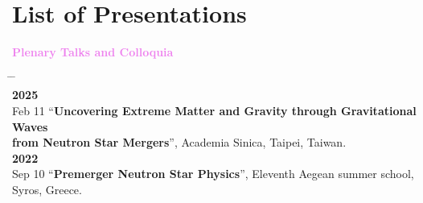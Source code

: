 \documentclass[10pt,floatfix,a4paper]{article}
\newcommand{\hk}[1]{\textcolor{Violet}{#1}}
\begin{document}
\section*{List of Presentations}
\hspace*{4mm}
{\large \bf \hk{Plenary Talks and Colloquia}}
\begin{tabbing}
  \hspace*{5mm} \= \hspace*{2cm} \= \hspace*{10cm} \\[-3ex]
  \> {\bf 2025} \> \\[1ex]
  \> Feb 11 \> ``\textbf{Uncovering Extreme Matter and Gravity through Gravitational Waves}\\
  \>\> \textbf{from Neutron Star Mergers}'', Academia Sinica, Taipei, Taiwan. \\
  \> {\bf 2022} \> \\[1ex]
  \> Sep 10 \> ``\textbf{Premerger Neutron Star Physics}'', Eleventh Aegean summer school, Syros, Greece.
\end{tabbing}
\end{document}
